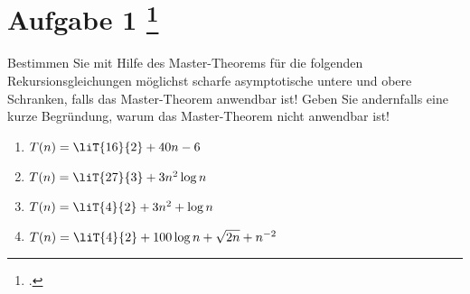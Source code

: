 \documentclass{lehramt-informatik-aufgabe}
\begin{document}
\let\T=\liT

\liAufgabenTitel{}
\section{Aufgabe 1
\footcite{66115:2011:03}}

Bestimmen Sie mit Hilfe des Master-Theorems für die folgenden
Rekursionsgleichungen möglichst scharfe asymptotische untere und obere
Schranken, falls das Master-Theorem anwendbar ist! Geben Sie andernfalls
eine kurze Begründung, warum das Master-Theorem nicht anwendbar ist!

\begin{enumerate}


\item $T(n) = \T{16}{2} + 40n - 6$




\item $T(n) = \T{27}{3} + 3n^2 \log n$



\item $T(n) = \T{4}{2} + 3n^2 + \log n$



\item $T(n)= \T{4}{2} + 100 \log n + \sqrt{2n} + n^{-2}$

\end{enumerate}
\end{document}
